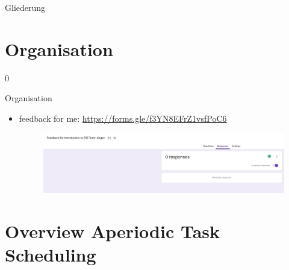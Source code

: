 \def\pascal{0}
\def\preview{1}









\begin{withoutheadline}
  \begin{withoutfootline}
    \begin{frame}
      \titlepagesecond
    \end{frame}
  \end{withoutfootline}

  \begin{frame}[shrink=10]{Gliederung}
    \tableofcontents[hideallsubsections]
  \end{frame}
\end{withoutheadline}

\section{Organisation}

\setcounter{section}{-1}

\if\pascal0{
  \begin{frame}{Organisation}
    \begin{itemize}
      \item \alert{feedback for me:} \url{https://forms.gle/f3YN8EFrZ1vsfPoC6}
      \begin{figure}
        \centering
        \includegraphics[height=0.3\paperheight]{./figures/feedback.png}
      \end{figure}
    \end{itemize}
  \end{frame}
}\fi

\section{Overview Aperiodic Task Scheduling}

